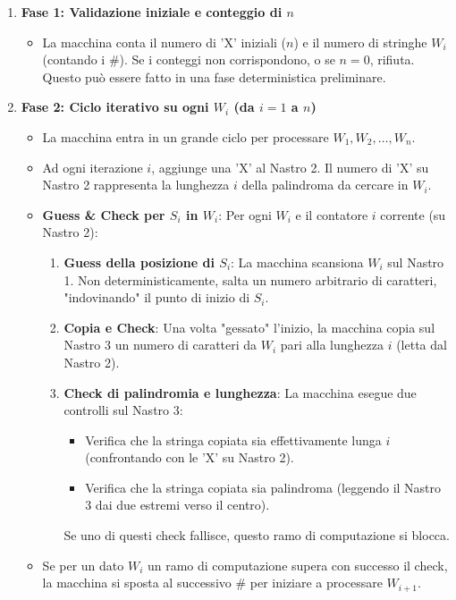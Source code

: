 \documentclass[a4paper]{article}
\theoremstyle{definition} %
\begin{document}
\begin{enumerate}
    \item \textbf{Fase 1: Validazione iniziale e conteggio di $n$}
        \begin{itemize}
            \item La macchina conta il numero di 'X' iniziali ($n$) e il numero di stringhe $W_i$ (contando i $\#$). Se i conteggi non corrispondono, o se $n=0$, rifiuta. Questo può essere fatto in una fase deterministica preliminare.
        \end{itemize}

    \item \textbf{Fase 2: Ciclo iterativo su ogni $W_i$ (da $i=1$ a $n$)}
        \begin{itemize}
            \item La macchina entra in un grande ciclo per processare $W_1, W_2, \dots, W_n$.
            \item Ad ogni iterazione $i$, aggiunge una 'X' al Nastro 2. Il numero di 'X' su Nastro 2 rappresenta la lunghezza $i$ della palindroma da cercare in $W_i$.
            \item \textbf{Guess \& Check per $S_i$ in $W_i$}: Per ogni $W_i$ e il contatore $i$ corrente (su Nastro 2):
                \begin{enumerate}
                    \item \textbf{Guess della posizione di $S_i$}: La macchina scansiona $W_i$ sul Nastro 1. Non deterministicamente, salta un numero arbitrario di caratteri, "indovinando" il punto di inizio di $S_i$.
                    
                    \item \textbf{Copia e Check}: Una volta "gessato" l'inizio, la macchina copia sul Nastro 3 un numero di caratteri da $W_i$ pari alla lunghezza $i$ (letta dal Nastro 2).
                    
                    \item \textbf{Check di palindromia e lunghezza}: La macchina esegue due controlli sul Nastro 3:
                    \begin{itemize}
                        \item Verifica che la stringa copiata sia effettivamente lunga $i$ (confrontando con le 'X' su Nastro 2).
                        \item Verifica che la stringa copiata sia palindroma (leggendo il Nastro 3 dai due estremi verso il centro).
                    \end{itemize}
                    Se uno di questi check fallisce, questo ramo di computazione si blocca.
                \end{enumerate}
            \item Se per un dato $W_i$ un ramo di computazione supera con successo il check, la macchina si sposta al successivo $\#$ per iniziare a processare $W_{i+1}$.
        \end{itemize}


\end{enumerate}
\end{document}
